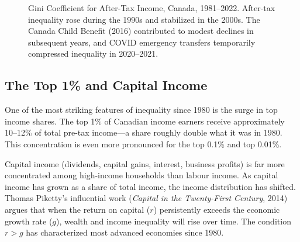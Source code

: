 \begin{figure}[H]
\centering
{}
\caption{Gini Coefficient for After-Tax Income, Canada, 1981--2022. After-tax inequality
  rose during the 1990s and stabilized in the 2000s. The Canada Child Benefit (2016)
  contributed to modest declines in subsequent years, and COVID emergency transfers
  temporarily compressed inequality in 2020--2021.}
\label{fig:gini_trend}
\end{figure}

\subsection{The Top 1\% and Capital Income}

One of the most striking features of inequality since 1980 is the surge in top income shares. The top 1\% of Canadian income earners receive approximately 10--12\% of total pre-tax income---a share roughly double what it was in 1980. This concentration is even more pronounced for the top 0.1\% and top 0.01\%.

Capital income (dividends, capital gains, interest, business profits) is far more concentrated among high-income households than labour income. As capital income has grown as a share of total income, the income distribution has shifted. Thomas Piketty's influential work (\textit{Capital in the Twenty-First Century}, 2014) argues that when the return on capital ($r$) persistently exceeds the economic growth rate ($g$), wealth and income inequality will rise over time. The condition $r > g$ has characterized most advanced economies since 1980.

